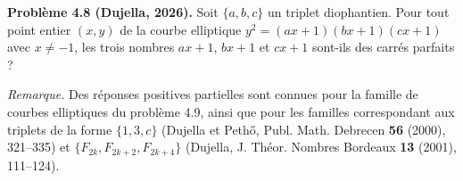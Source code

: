 \textbf{Problème 4.8 (Dujella, 2026).} Soit $\{a,b,c\}$ un triplet diophantien. Pour tout point entier $(x,y)$ de la courbe elliptique $y^2=(ax+1)(bx+1)(cx+1)$ avec $x \neq -1$, les trois nombres $ax+1$, $bx+1$ et $cx+1$ sont-ils des carrés parfaits ?

\medskip

\textit{Remarque.} Des réponses positives partielles sont connues pour la famille de courbes elliptiques du problème 4.9, ainsi que pour les familles correspondant aux triplets de la forme $\{1,3,c\}$ (Dujella et Pethő, Publ. Math. Debrecen \textbf{56} (2000), 321--335) et $\{F_{2k},F_{2k+2},F_{2k+4}\}$ (Dujella, J. Théor. Nombres Bordeaux \textbf{13} (2001), 111--124).
